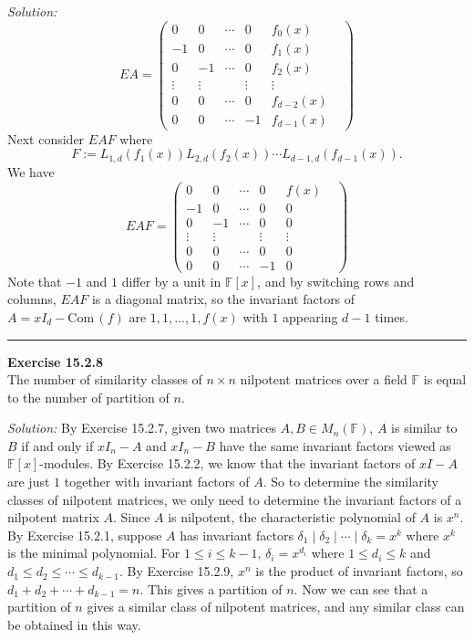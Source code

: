 \documentclass[a4paper, 12pt]{article}
\newenvironment{problem}[2][Exercise]
    { \begin{mdframed}[backgroundcolor=gray!20] \textbf{#1 #2} \\}
    {  \end{mdframed}}
\newenvironment{solution}
    {\textit{Solution:}}
    {}
\newcommand{\Com}{\text{Com}\,}
\begin{document}
\begin{solution}
\[EA=\begin{pmatrix}
	0&0&\cdots&0&f_0(x)\\ 
	-1&0&\cdots&0&f_1(x)\\ 
	0&-1&\cdots&0&f_2(x)\\ 
	\vdots&\vdots&&\vdots&\vdots&\\ 
	0&0&\cdots&0&f_{d-2}(x)\\ 
	0&0&\cdots&-1&f_{d-1}(x)
\end{pmatrix}\]
Next consider \(EAF\) where 
\[F:=L_{1,d}(f_1(x))L_{2,d}(f_2(x))\cdots L_{d-1,d}(f_{d-1}(x)).\]
We have 
\[EAF=\begin{pmatrix}
	0&0&\cdots&0&f(x)\\ 
	-1&0&\cdots&0&0\\ 
	0&-1&\cdots&0&0\\ 
	\vdots&\vdots&&\vdots&\vdots&\\ 
	0&0&\cdots&0&0\\ 
	0&0&\cdots&-1&0
\end{pmatrix}\]
Note that \(-1\) and \(1\) differ by a unit in \(\mathbb{F}[x]\), and by switching rows and columns, \(EAF\) is a diagonal matrix, so the invariant factors of \(A=xI_d-\Com(f)\) are 
\(1,1,\ldots,1,f(x)\) with \(1\) appearing \(d-1\) times.
\end{solution}

\noindent\rule{7in}{2.8pt}
\begin{problem}{15.2.8}
The number of similarity classes of \(n\times n\) nilpotent matrices over a field \(\mathbb{F}\) is equal to the number of partition of \(n\).
\end{problem}
\begin{solution}
By Exercise 15.2.7, given two matrices \(A,B\in M_n(\mathbb{F})\), \(A\) is similar to \(B\) if and only if \(xI_n-A\) and \(xI_n-B\) have the same 
invariant factors viewed as \(\mathbb{F}[x]\)-modules. By Exercise 15.2.2, we know that the invariant factors of \(xI-A\) are just \(1\) together with invariant factors of \(A\). So to determine the similarity classes of nilpotent matrices, we only need to determine the invariant factors of a nilpotent matrix \(A\). Since \(A\) is nilpotent, the characteristic polynomial of \(A\) is \(x^n\). By Exercise 15.2.1, suppose \(A\) has invariant factors \(\delta_1\mid \delta_2\mid \cdots \mid \delta_k=x^k\) where \(x^k\) is the minimal polynomial. 
For \(1\leq i\leq k-1\), \(\delta_i=x^{d_i}\) where \(1\leq d_i\leq k\) and \(d_1\leq  d_2\leq \cdots\leq d_{k-1}\). By Exercise 15.2.9, \(x^n\) is the product of invariant factors, so \(d_1+d_2+\cdots+d_{k-1}=n\). This gives a partition of \(n\). Now we can see that 
a partition of \(n\) gives a similar class of nilpotent matrices, and any similar class can be obtained in this way.
\end{solution}
\end{document}
